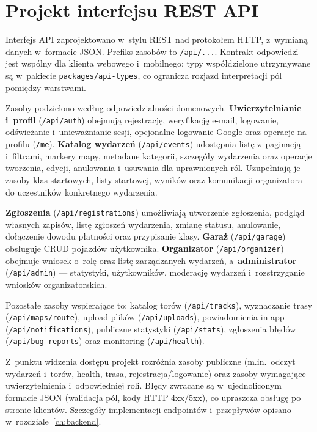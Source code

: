 \documentclass{sprz}
\begin{document}
\section{Projekt interfejsu REST API}
\label{sec:rest-api}
Interfejs API zaprojektowano w~stylu REST nad protokołem HTTP, z~wymianą danych w~formacie JSON. Prefiks zasobów to \texttt{/api/...}. Kontrakt odpowiedzi jest wspólny dla klienta webowego i~mobilnego; typy współdzielone utrzymywane są w~pakiecie \texttt{packages/api-types}, co ogranicza rozjazd interpretacji pól pomiędzy warstwami.

Zasoby podzielono według odpowiedzialności domenowych. \textbf{Uwierzytelnianie i~profil} (\texttt{/api/auth}) obejmują rejestrację, weryfikację e-mail, logowanie, odświeżanie i~unieważnianie sesji, opcjonalne logowanie Google oraz operacje na profilu (\texttt{/me}). \textbf{Katalog wydarzeń} (\texttt{/api/events}) udostępnia listę z~paginacją i~filtrami, markery mapy, metadane kategorii, szczegóły wydarzenia oraz operacje tworzenia, edycji, anulowania i~usuwania dla uprawnionych ról. Uzupełniają je zasoby klas startowych, listy startowej, wyników oraz komunikacji organizatora do uczestników konkretnego wydarzenia.

\textbf{Zgłoszenia} (\texttt{/api/registrations}) umożliwiają utworzenie zgłoszenia, podgląd własnych zapisów, listę zgłoszeń wydarzenia, zmianę statusu, anulowanie, dołączenie dowodu płatności oraz przypisanie klasy. \textbf{Garaż} (\texttt{/api/garage}) obsługuje CRUD pojazdów użytkownika. \textbf{Organizator} (\texttt{/api/organizer}) obejmuje wniosek o~rolę oraz listę zarządzanych wydarzeń, a~\textbf{administrator} (\texttt{/api/admin}) --- statystyki, użytkowników, moderację wydarzeń i~rozstrzyganie wniosków organizatorskich.

Pozostałe zasoby wspierające to: katalog torów (\texttt{/api/tracks}), wyznaczanie trasy (\texttt{/api/maps/route}), upload plików (\texttt{/api/uploads}), powiadomienia in-app (\texttt{/api/notifications}), publiczne statystyki (\texttt{/api/stats}), zgłoszenia błędów (\texttt{/api/bug-reports}) oraz monitoring (\texttt{/api/health}).

Z~punktu widzenia dostępu projekt rozróżnia zasoby publiczne (m.in.\ odczyt wydarzeń i~torów, health, trasa, rejestracja/logowanie) oraz zasoby wymagające uwierzytelnienia i~odpowiedniej roli. Błędy zwracane są w~ujednoliconym formacie JSON (walidacja pól, kody HTTP 4xx/5xx), co upraszcza obsługę po stronie klientów. Szczegóły implementacji endpointów i~przepływów opisano w~rozdziale~\ref{ch:backend}.
\end{document}
